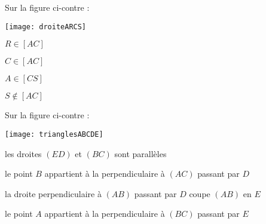 


\begin{QCM}
  \begin{GroupeQCM}
    \begin{exercice}
     Sur la figure ci-contre : \vspace{-2em} \begin{center} \texttt{[image: droiteARCS]} \end{center} \vspace{-1em}
      \begin{ChoixQCM}{4}
      \item $R \in [AC]$
      \item $C \in [AC]$
      \item $A \in [CS]$
      \item $S \notin [AC]$
      \end{ChoixQCM}
\begin{corrige}
   \end{corrige}
    \end{exercice}
 
    
    \begin{exercice}
     Sur la figure ci-contre : \vspace{-2em}\begin{center}\texttt{[image: trianglesABCDE]}\end{center}\vspace{-1em}
      \begin{ChoixQCM}{4}
      \item les droites $(ED)$ et $(BC)$ sont parallèles
      \item le point $B$ appartient à la perpendiculaire à $(AC)$ passant par $D$
      \item la droite perpendiculaire à $(AB)$ passant par $D$ coupe $(AB)$ en $E$
      \item le point $A$ appartient à la  perpendiculaire à $(BC)$ passant par $E$
      \end{ChoixQCM}
\begin{corrige}
   \end{corrige}
    \end{exercice}



\end{GroupeQCM}
\end{QCM}
